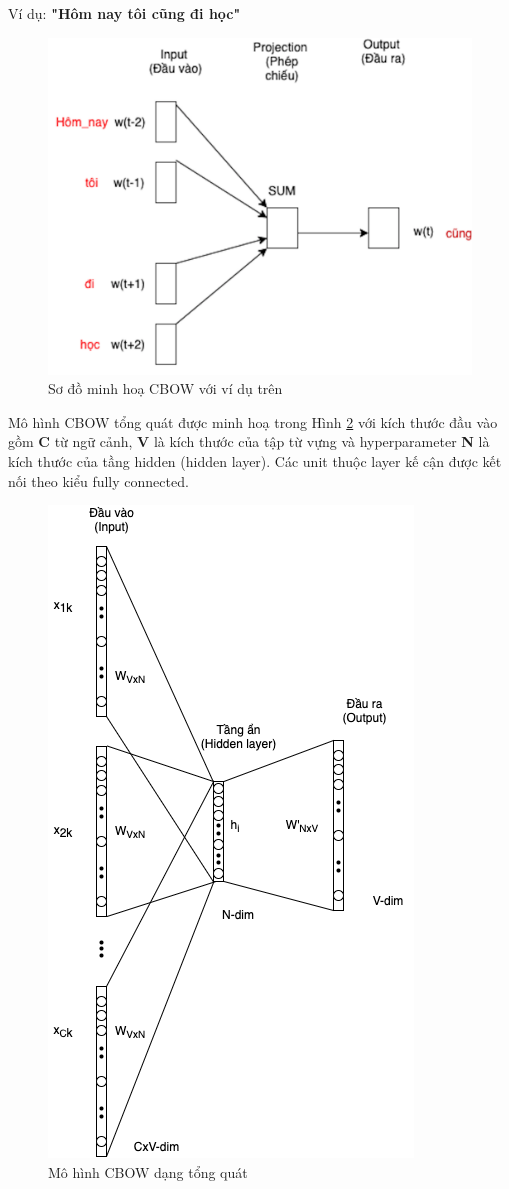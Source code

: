 Ví dụ: \textbf{"Hôm nay tôi cũng đi học"}
\begin{figure}[!htb]
	\centering
		\includegraphics[width=0.5\columnwidth]{books/artificial-neural-network/chapter04/figure/cbow_3.png}
        \caption{Sơ đồ minh hoạ CBOW với ví dụ trên}
        \label{fig:cbow2}
\end{figure}

Mô hình CBOW tổng quát được minh hoạ trong Hình \ref{fig:cbow3} với kích thước đầu vào gồm \textbf{C} từ ngữ cảnh, \textbf{V} là kích thước của tập từ vựng và hyperparameter \textbf{N} là kích thước của tầng hidden (hidden layer). Các unit thuộc layer kế cận được kết nối theo kiểu fully connected.
\clearpage
\begin{figure}[!h]
    \centering
    \includegraphics[width=0.5\columnwidth]{books/artificial-neural-network/chapter04/figure/cbow_4.png}
    \caption{Mô hình CBOW dạng tổng quát}
    \label{fig:cbow3}
\end{figure}

